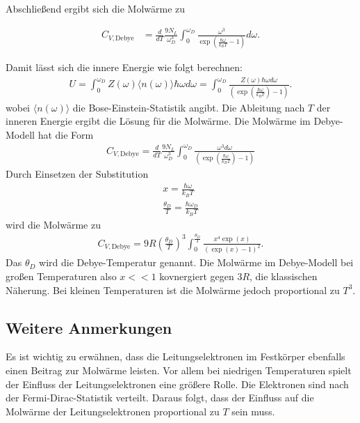 Abschließend ergibt sich die Molwärme zu 

\begin{align}
    C_{V, \text{Debye}} &= \frac{d}{d T} \frac{9 N_L}{\omega_D^3} \int_0^{\omega_D} \frac{\omega^3}{\exp \left(\frac{\hbar \omega}{k_B T} -1 \right)} d \omega.
\end{align}

Damit lässt sich die innere Energie wie folgt berechnen:
\begin{align}
    U =  \int_0^{\omega_D} Z(\omega) \langle n(\omega)\rangle \hbar \omega d \omega=  \int_0^{\omega_D} \frac{Z(\omega) \hbar \omega d \omega}{\left(\exp \left(\frac{\hbar \omega}{k_B T}\right) -1 \right)}.
\end{align}
wobei $\langle n(\omega)\rangle$ die Bose-Einstein-Statistik angibt. Die Ableitung nach $T$ der inneren Energie ergibt die Lösung für die Molwärme. Die Molwärme im Debye-Modell hat die Form
\begin{align*}
    C_{V,\text{Debye}}= \frac{d}{d T}\frac{9 N_L}{\omega_D^3} \int_0^{\omega_D} \frac{\omega^3 d\omega}{\left(\exp \left(\frac{\hbar \omega}{k_B T}\right) -1 \right)}
\end{align*}
Durch Einsetzen der Substitution 
\begin{align}
    \label{eqn:debyesubst}
    x = \frac{\hbar \omega}{k_B T} \\  \frac{\theta_D}{T} = \frac{\hbar \omega_D}{ k_B T}
\end{align}
wird die Molwärme zu
\begin{align}
    C_{V,\text{Debye}} = 9 R \left(\frac{\theta_D}{T}\right)^3 \int_0^{\frac{\theta_D}{T}} \frac{x^4 \exp \left(x\right)}{ \left(\exp(x) -1\right)^2}.
\end{align}
Das $\theta_D$ wird die Debye-Temperatur genannt. Die Molwärme im Debye-Modell bei großen Temperaturen also $x<<1$ kovnergiert gegen $3 R$, die klassischen Näherung. Bei kleinen Temperaturen ist die Molwärme 
jedoch proportional zu $T^3$. 
\subsection{Weitere Anmerkungen}
Es ist wichtig zu erwähnen, dass die Leitungselektronen im Festkörper ebenfalls einen Beitrag zur Molwärme leisten. Vor allem bei niedrigen Temperaturen spielt der Einfluss der Leitungselektronen eine größere Rolle. 
Die Elektronen sind nach der Fermi-Dirac-Statistik verteilt. Daraus folgt, dass der Einfluss auf die Molwärme der Leitungselektronen proportional zu $T$ sein muss. \\
